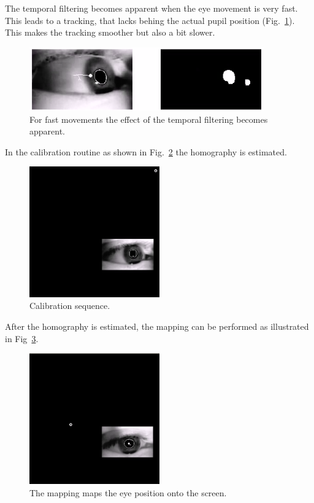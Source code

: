 The temporal filtering becomes apparent when the eye movement is very fast. This leads to a tracking, that lacks behing the actual pupil position (Fig.~\ref{fig:pupiltemporal}). This makes the tracking smoother but also a bit slower.

\begin{figure}[h]
  \centering
  \includegraphics[width=0.9\textwidth]{fin_temporal.png}
  \caption{For fast movements the effect of the temporal filtering becomes apparent.}\label{fig:pupiltemporal}
\end{figure}

In the calibration routine as shown in Fig.~\ref{fig:calibration} the homography is estimated.

\begin{figure}[h]
  \centering
  \includegraphics[width=0.5\textwidth]{fin_calibration.png}
  \caption{Calibration sequence.}\label{fig:calibration}
\end{figure}

After the homography is estimated, the mapping can be performed as illustrated in Fig~\ref{fig:mapping}.

\begin{figure}[h]
  \centering
  \includegraphics[width=0.5\textwidth]{fin_mapping.png}
  \caption{The mapping maps the eye position onto the screen.}\label{fig:mapping}
\end{figure}

